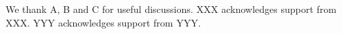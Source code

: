 We thank A, B and C for useful discussions.
%
XXX acknowledges support from XXX.
%
YYY acknowledges support from YYY.

